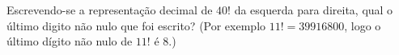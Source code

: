 Escrevendo-se a representação decimal de $40!$ da esquerda para direita, qual o último digito não nulo que foi escrito? (Por exemplo $11! = 39916800$, logo o último dígito não nulo de $11!$ é $8$.)
